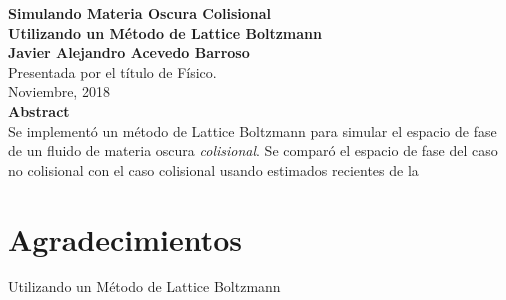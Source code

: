 \newpage
\thispagestyle{plain}
\begin{center}
      \Large\textbf{Simulando Materia Oscura Colisional}\\
      \vspace{-4mm}\large\textbf{Utilizando un Método de Lattice Boltzmann}\\
\vspace{08mm}
      \Large\textbf{Javier Alejandro Acevedo Barroso}\\
      \vspace{05mm}\large{Presentada por el título de Físico.}\\
      \vspace{-4mm}\large{Noviembre, 2018}\\
      
\vspace{09mm}
      \large\textbf{Abstract}\\
      \vspace{05mm}\normalsize{
      Se implementó un método de Lattice Boltzmann para simular el espacio de fase de un fluido de materia oscura \emph{colisional}. Se comparó el espacio de fase del caso no colisional con el caso colisional usando estimados recientes de la }\\
\end{center}
\newpage
\thispagestyle{plain}
\chapter*{Agradecimientos}
      \normalsize{Utilizando un Método de Lattice Boltzmann}\\
